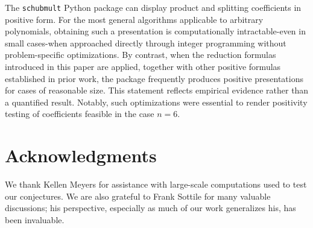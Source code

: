 \documentclass[reqno]{amsart}
\theoremstyle{definition}
\theoremstyle{remark}
\numberwithin{equation}{subsection}
\begin{document}
The \verb|schubmult| Python package can display product and splitting coefficients in positive form. For the most general algorithms applicable to arbitrary polynomials, obtaining such a presentation is computationally intractable-even in small cases-when approached directly through integer programming without problem-specific optimizations. By contrast, when the reduction formulas introduced in this paper are applied, together with other positive formulas established in prior work, the package frequently produces positive presentations for cases of reasonable size. This statement reflects empirical evidence rather than a quantified result. Notably, such optimizations were essential to render positivity testing of coefficients feasible in the case $n=6$.


\section*{Acknowledgments}


We thank Kellen Meyers for assistance with large-scale computations used to test our conjectures. We are also grateful to Frank Sottile for many valuable discussions; his perspective, especially as much of our work generalizes his, has been invaluable.




\end{document}
